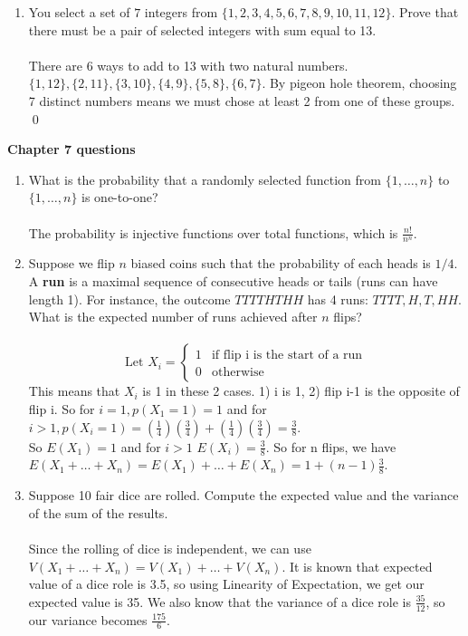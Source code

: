 \documentclass[12pt]{article}
\begin{document}
\begin{enumerate}
\item You select a set of $7$ integers from $\{1, 2, 3, 4,5,6,7,8,9,10,11,12\}$. Prove that there must be a pair of selected integers with sum equal to 13.\\\\
There are 6 ways to add to 13 with two natural numbers. $\{1,12\},\{2,11\},\{3,10\},\{4,9\},\{5,8\},\{6,7\}$. By pigeon hole theorem, choosing 7 distinct numbers means we must chose at least 2 from one of these groups. \qed
\end{enumerate}

{\bf Chapter 7 questions}
\begin{enumerate}

\item What is the probability that a randomly selected function from $\{1, \ldots, n\}$ to $\{1, \ldots, n\}$ is one-to-one?\\\\
The probability is injective functions over total functions, which is $\frac{n!}{n^n}$.

\item Suppose we flip $n$ biased coins such that the probability of each heads is $1/4$. A {\bf run} is a maximal sequence of consecutive heads or tails (runs can have length 1). For instance, the outcome $TTTTHTHH$ has 4 runs: $TTTT, H, T, HH$. What is the expected number of runs achieved after $n$ flips?\\\\
\begin{equation}
	\text{Let } X_i=
	\begin{cases}
		1 & \text{if flip i is the start of a run} \\
		0 & \text{otherwise }
	\end{cases}
\end{equation}
This means that $X_i$ is 1 in these 2 cases. 1) i is 1, 2) flip i-1 is the opposite of flip i. So for $i=1, p(X_1=1) = 1$ and for $i>1, p(X_i=1)=(\frac{1}{4})(\frac{3}{4})+(\frac{1}{4})(\frac{3}{4})=\frac{3}{8}$.\\
So $E(X_1) = 1$ and for $i>1$ $E(X_i)=\frac{3}{8}$. So for n flips, we have $E(X_1+\ldots+X_n) = E(X_1)+\ldots+E(X_n)=1+(n-1)\frac{3}{8}$.


\item Suppose 10 fair dice are rolled. Compute the expected value and the variance of the sum of the results.\\\\
Since the rolling of dice is independent, we can use $V(X_1+\ldots+X_n)=V(X_1)+\ldots+V(X_n)$. It is known that expected value of a dice role is 3.5, so using Linearity of Expectation, we get our expected value is 35. We also know that the variance of a dice role is $\frac{35}{12}$, so our variance becomes $\frac{175}{6}$.


\end{enumerate}
\end{document}

